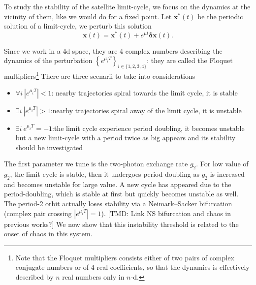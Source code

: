 \documentclass[aps,prx,reprint,floatfix,amsmath,amssymb,longbibliography]{revtex4-2}
\newcommand{\TMD}[1]{{\color{Blue} [TMD: {#1}]}}
\begin{document}
To study the stability of the satellite limit-cycle, we focus on the dynamics at the vicinity of them, like we would do for a fixed point. 
Let $\boldsymbol{x}^*(t)$ be the periodic solution of a limit-cycle, we perturb this solution
\begin{equation}
    \boldsymbol{x}(t)=\boldsymbol{x}^*(t)+e^{\mu t}\boldsymbol{\delta}\boldsymbol{x}(t).
\end{equation}

Since we work in a 4d space, they are 4 complex numbers describing the dynamics of the perturbation $\left\{e^{\mu_iT}\right\}_{i\in\{1,2,3,4\}}$: they are called the Floquet multipliers\footnote{Note that the Floquet multipliers consists either of two pairs of complex conjugate numbers or of 4 real coefficients, so that the dynamics is effectively described by $n$ real numbers only in $n$-d.} There are three scenarii to take into considerations
\begin{itemize}
    \item $\forall i \: |e^{\mu_iT}|<1$: nearby trajectories spiral towards the limit cycle, it is stable
    \item $\exists i\:|e^{\mu_iT}|>1$:nearby trajectories spiral away of the limit cycle, it is unstable
    \item $\exists i\:e^{\mu_iT}=-1$:the limit cycle experience period doubling, it becomes unstable but a new limit-cycle with a period twice as big appears and its stability should be investigated
\end{itemize}

The first parameter we tune is the two-photon exchange rate $g_2$. For low value of $g_2$, the limit cycle is stable, then it undergoes period-doubling as $g_2$ is increased and becomes unstable for large value. A new cycle has appeared due to the period-doubling, which is stable at first but quickly becomes unstable as well. The period-2 orbit actually loses stability via a Neimark–Sacker bifurcation (complex pair crossing $|e^{\mu_i T}|=1$). \TMD{Link NS bifurcation and chaos in previous works?} We now show that this instability threshold is related to the onset of chaos in this system.
\end{document}

